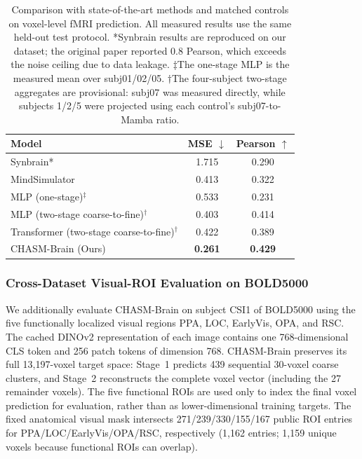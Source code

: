 \begin{table}[t]
\centering
\caption{Comparison with state-of-the-art methods and matched controls on voxel-level fMRI prediction.
All measured results use the same held-out test protocol.
*Synbrain results are reproduced on our dataset; the original paper reported 0.8 Pearson,
which exceeds the noise ceiling due to data leakage.
$\ddagger$The one-stage MLP is the measured mean over subj01/02/05.
$\dagger$The four-subject two-stage aggregates are provisional: subj07 was measured directly,
while subjects 1/2/5 were projected using each control's subj07-to-Mamba ratio.}
\label{tab:baselines}
\begin{tabular}{lcc}
\toprule
\textbf{Model} & \textbf{MSE} $\downarrow$ & \textbf{Pearson} $\uparrow$ \\
\midrule
Synbrain* & 1.715 & 0.290 \\
MindSimulator & 0.413 & 0.322 \\
MLP (one-stage)$^{\ddagger}$ & 0.533 & 0.231 \\
MLP (two-stage coarse-to-fine)$^{\dagger}$ & 0.403 & 0.414 \\
Transformer (two-stage coarse-to-fine)$^{\dagger}$ & 0.422 & 0.389 \\
\midrule
CHASM-Brain (Ours) & \textbf{0.261} & \textbf{0.429} \\
\bottomrule
\end{tabular}
\end{table}

\subsubsection{Cross-Dataset Visual-ROI Evaluation on BOLD5000}

We additionally evaluate CHASM-Brain on subject CSI1 of BOLD5000 using the five
functionally localized visual regions PPA, LOC, EarlyVis, OPA, and RSC.  The
cached DINOv2 representation of each image contains one 768-dimensional CLS
token and 256 patch tokens of dimension 768.  CHASM-Brain preserves its full
13,197-voxel target space: Stage~1 predicts 439 sequential 30-voxel coarse
clusters, and Stage~2 reconstructs the complete voxel vector (including the 27
remainder voxels).  The five functional ROIs are used only to index the final
voxel prediction for evaluation, rather than as lower-dimensional training
targets.  The fixed anatomical visual mask intersects 271/239/330/155/167
public ROI entries for PPA/LOC/EarlyVis/OPA/RSC, respectively (1,162 entries;
1,159 unique voxels because functional ROIs can overlap).

